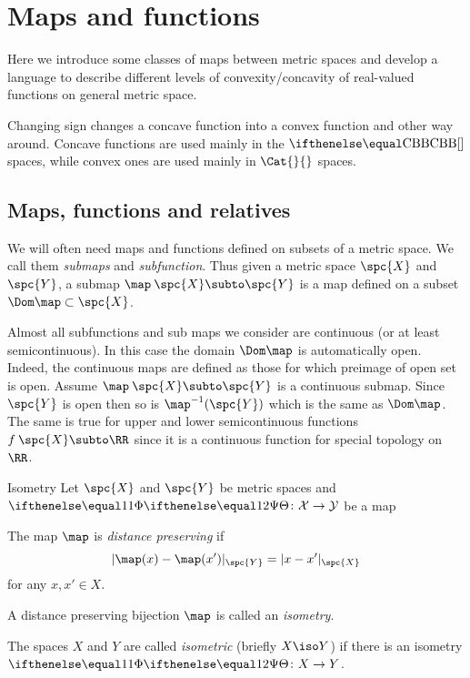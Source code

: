 \chapter{Maps and functions}

Here we introduce some classes of maps between metric spaces and develop a language to describe different levels of convexity/concavity of real-valued functions on general metric space.

Changing sign changes a concave function into a convex function and other way around.
Concave functions are used mainly in the $\Alex{}$ spaces,
while convex ones are used  mainly in $\Cat{}{}$ spaces.



\section{Maps, functions and relatives}

We will often need maps and functions defined on subsets of a metric space. We call them \emph{submaps} and \emph{subfunction}.
Thus given a metric space $\spc{X}$ and $\spc{Y}$, 
a submap $\map\:\spc{X}\subto \spc{Y}$ is a map defined on a subset $\Dom\map\subset \spc{X}$.

Almost all subfunctions and sub maps we consider are continuous (or at least semicontinuous).
In this case the domain $\Dom\map$ is automatically open.
Indeed, the continuous maps are defined as those for which preimage of open set is open.
Assume $\map\:\spc{X}\subto \spc{Y}$ is a continuous submap.
Since $\spc{Y}$ is open then so is $\map^{-1}(\spc{Y})$ 
which is the same as $\Dom \map$.
The same is true for upper and lower semicontinuous functions $f\:\spc{X}\subto \RR$ since it is a continuous function for special topology on $\RR$.

\begin{thm}{Isometry}
Let $\spc{X}$ and $\spc{Y}$ be metric spaces
and $\map\:\spc{X}\to \spc{Y}$ be a map
\begin{subthm}{}
The map $\map$ is \emph{distance preserving} if
$$|\map(x)-\map(x')|_{\spc{Y}}=|x-x'|_{\spc{X}}$$
for any $x,x'\in X$.
\end{subthm}

\begin{subthm}{}
A distance preserving bijection $\map$ is called an \emph{isometry}.
\end{subthm}

\begin{subthm}{}
The spaces $X$ and $Y$ are called \emph{isometric} (briefly $X\iso Y$)
 if there is an isometry  $\map\:X\to Y$.
\end{subthm}

\end{thm}



